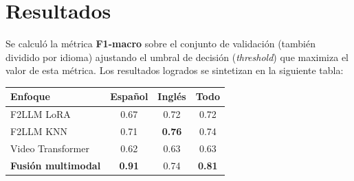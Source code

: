 \documentclass[11pt,a4paper]{article}
\begin{document}
\section*{Resultados}
Se calculó la métrica \textbf{F1-macro} sobre el conjunto de validación (también dividido por idioma) ajustando el umbral de decisión (\emph{threshold}) que maximiza el valor de esta métrica. Los resultados logrados se sintetizan en la siguiente tabla:

\begin{table}[h]
\centering
\begin{tabular}{@{}lccc@{}}
\toprule
\textbf{Enfoque} & \textbf{Español} & \textbf{Inglés} & \textbf{Todo} \\ \midrule
F2LLM LoRA               & 0.67               & 0.72              & 0.72                   \\
F2LLM KNN               & 0.71               & \textbf{0.76}              & 0.74                   \\
Video Transformer & 0.62               & 0.63             & 0.63                   \\
\textbf{Fusión multimodal} & \textbf{0.91} & 0.74 & \textbf{0.81} \\ \bottomrule
\end{tabular}
\end{table}
\end{document}
